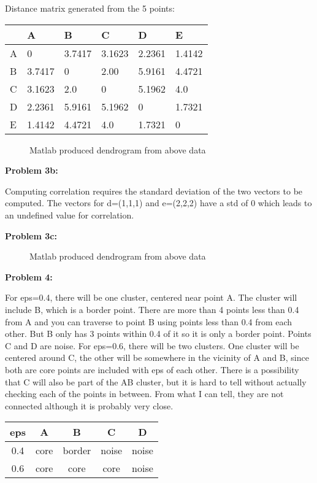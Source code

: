 \documentclass[11pt]{article}
\numberwithin{equation}{section}  %
\begin{document}
\noindent Distance matrix generated from the 5 points:
\begin{tabular}{| l | l | l | l | l | l | }
\hline
  \ & A & B & C & D & E \\ \hline
  A & 0 & 3.7417 & 3.1623 & 2.2361 & 1.4142 \\ \hline
  B & 3.7417 & 0 & 2.00 & 5.9161 & 4.4721 \\ \hline
  C & 3.1623 & 2.0 & 0 & 5.1962 & 4.0 \\ \hline
  D & 2.2361 & 5.9161 & 5.1962 & 0 & 1.7321 \\ \hline
  E & 1.4142 & 4.4721 & 4.0 & 1.7321 & 0 \\ \hline
\end{tabular}
\begin{figure}[htb!]
\centering
{}
\caption{Matlab produced dendrogram from above data}
\label{fig:FigureExample1}
\end{figure}

\vspace*{0.25in}

\noindent\textbf{Problem 3b: }

\noindent Computing correlation requires the standard deviation of the two vectors to be computed. The vectors for d=(1,1,1) and e=(2,2,2) have a std of 0 which leads to an undefined value for correlation.

\vspace*{0.25in}

\noindent\textbf{Problem 3c: }

\noindent
\begin{figure}[htb!]
\centering
{}
\caption{Matlab produced dendrogram from above data}
\label{fig:FigureExample2}
\end{figure}

\vspace*{0.25in}

\noindent\textbf{Problem 4: }

\noindent For eps=0.4, there will be one cluster, centered near point A. The cluster will include B, which is a border point. There are more than 4 points less than 0.4 from A and you can traverse to point B using points less than 0.4 from each other. But B only has 3 points within 0.4 of it so it is only a border point. Points C and D are noise. For eps=0.6, there will be two clusters. One cluster will be centered around C, the other will be somewhere in the vicinity of A and B, since both are core points are included with eps of each other. There is a possibility that C will also be part of the AB cluster, but it is hard to tell without actually checking each of the points in between. From what I can tell, they are not connected although it is probably very close.\\
\begin{tabular}{| c | c | c | c | c | }
\hline
  eps &A & B & C & D \\ \hline
  \hline
  0.4 & core & border & noise & noise \\ \hline
  0.6 & core & core & core & noise \\ \hline
\end{tabular}
\end{document}
